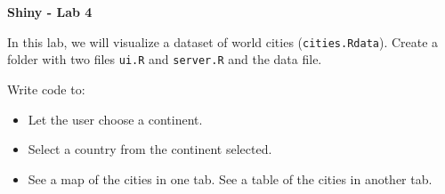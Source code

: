 \documentclass[letterpaper, 12pt]{article}
\begin{document}
\begin{center}
\textbf{\Large{Shiny - Lab 4}}
\end{center}

\vspace{2em}

In this lab, we will visualize a dataset of world cities (\verb|cities.Rdata|). Create a folder with two files \verb|ui.R| and \verb|server.R| and the data file.

\vspace{1em}

Write code to:
\begin{itemize}
	\item Let the user choose a continent.
	\item Select a country from the continent selected.
	\item See a map of the cities in one tab. See a table of the cities in another tab.
\end{itemize}

\vspace{1em}
 
\end{document}

